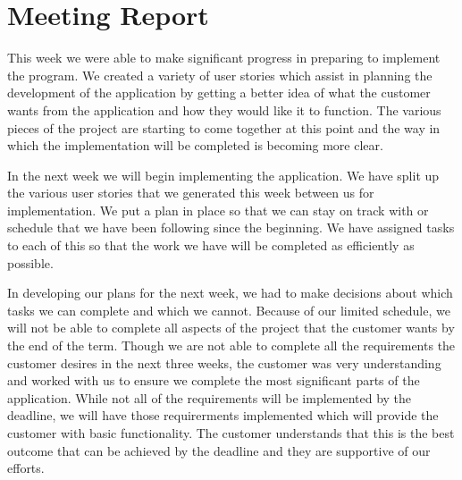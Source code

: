 \documentclass[12pt]{article}
\begin{document}
\section{Meeting Report}
\begin{flushleft}
This week we were able to make significant progress in preparing to implement the program. We created a variety of user stories which assist in planning the development of the application by getting a better idea of what the customer wants from the application and how they would like it to function. The various pieces of the project are starting to come together at this point and the way in which the implementation will be completed is becoming more clear.
\end{flushleft}
\begin{flushleft}
In the next week we will begin implementing the application. We have split up the various user stories that we generated this week between us for implementation. We put a plan in place so that we can stay on track with or schedule that we have been following since the beginning. We have assigned tasks to each of this so that the work we have will be completed as efficiently as possible.
\end{flushleft}
\begin{flushleft}
In developing our plans for the next week, we had to make decisions about which tasks we can complete and which we cannot. Because of our limited schedule, we will not be able to complete all aspects of the project that the customer wants by the end of the term. Though we are not able to complete all the requirements the customer desires in the next three weeks, the customer was very understanding and worked with us to ensure we complete the most significant parts of the application. While not all of the requirements will be implemented by the deadline, we will have those requirerments implemented which will provide the customer with basic functionality. The customer understands that this is the best outcome that can be achieved by the deadline and they are supportive of our efforts.
\end{flushleft}
\end{document}
